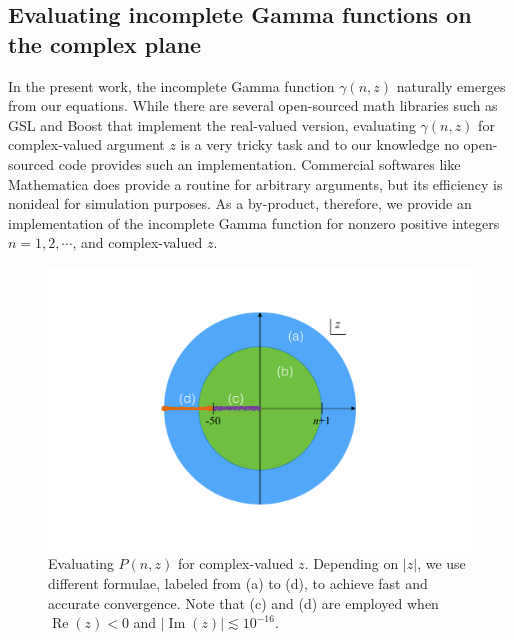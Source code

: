 \documentclass[12pt,letter,onecolumn,notitlepage]{article}
\DeclareMathOperator{\re}{Re}
\DeclareMathOperator{\im}{Im}
\begin{document}
\begin{appendices}
\section{Evaluating incomplete Gamma functions on the complex plane}
\label{appen: incom_gamma}
In the present work, the incomplete Gamma function $\gamma(n,z)$ naturally emerges from our equations. While there are several open-sourced math libraries such as GSL and Boost that implement the real-valued version, evaluating $\gamma(n,z)$ for complex-valued argument $z$ is a very tricky task and to our knowledge no open-sourced code provides such an implementation. Commercial softwares like Mathematica does provide a routine for arbitrary arguments, but its efficiency is nonideal for simulation purposes. As a by-product, therefore, we provide an implementation of the incomplete Gamma function for nonzero positive integers $n=1, 2, \cdots$, and complex-valued $z$.

\begin{figure}[htbp]%
	\centering
	\includegraphics[trim=2cm 2.2cm 2cm 2.2cm, clip=true, scale=0.7]{incomplete_Gamma_strategy}
	\caption{Evaluating $P(n,z)$ for complex-valued $z$. Depending on $|z|$, we use different formulae, labeled from (a) to (d), to achieve fast and accurate convergence. Note that (c) and (d) are employed when $\re(z)<0$ and $|\im(z)|\lesssim10^{-16}$.}
	\label{fig:incomplete Gamma}
\end{figure}


\end{appendices}
\end{document}

